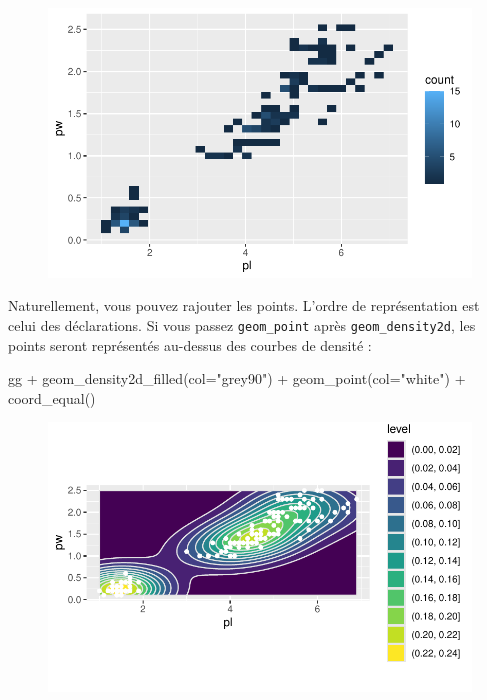 \documentclass[
  letterpaper,
  DIV=11,
  numbers=noendperiod]{scrreprt}
\newenvironment{Shaded}{\begin{snugshade}}{\end{snugshade}}
\newcommand{\AttributeTok}[1]{\textcolor[rgb]{0.40,0.45,0.13}{#1}}
\newcommand{\FunctionTok}[1]{\textcolor[rgb]{0.28,0.35,0.67}{#1}}
\newcommand{\NormalTok}[1]{\textcolor[rgb]{0.00,0.23,0.31}{#1}}
\newcommand{\SpecialCharTok}[1]{\textcolor[rgb]{0.37,0.37,0.37}{#1}}
\newcommand{\StringTok}[1]{\textcolor[rgb]{0.13,0.47,0.30}{#1}}
\begin{document}
\begin{figure}[H]

{\centering \includegraphics{ggplot2_files/figure-pdf/unnamed-chunk-22-2.pdf}

}

\end{figure}

Naturellement, vous pouvez rajouter les points. L'ordre de
représentation est celui des déclarations. Si vous passez
\texttt{geom\_point} après \texttt{geom\_density2d}, les points seront
représentés au-dessus des courbes de densité :

\begin{Shaded}
\begin{Highlighting}[]
\NormalTok{gg }\SpecialCharTok{+} \FunctionTok{geom\_density2d\_filled}\NormalTok{(}\AttributeTok{col=}\StringTok{"grey90"}\NormalTok{) }\SpecialCharTok{+} \FunctionTok{geom\_point}\NormalTok{(}\AttributeTok{col=}\StringTok{"white"}\NormalTok{) }\SpecialCharTok{+} \FunctionTok{coord\_equal}\NormalTok{()}
\end{Highlighting}
\end{Shaded}

\begin{figure}[H]

{\centering \includegraphics{ggplot2_files/figure-pdf/unnamed-chunk-23-1.pdf}

}

\end{figure}
\end{document}
